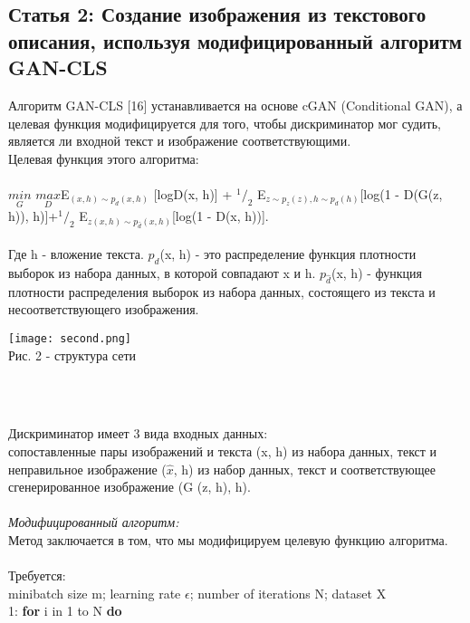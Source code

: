 \documentclass{article}
\begin{document}
    \newpage
    \begin{center} 
    \section{Статья 2: Создание изображения из текстового описания, используя модифицированный алгоритм GAN-CLS}
    \end{center} 
    \large
    Алгоритм GAN-CLS [16] устанавливается на основе cGAN (Conditional GAN), а целевая функция модифицируется для того, чтобы дискриминатор мог судить, является ли входной текст и изображение соответствующими.\\
    Целевая функция этого алгоритма:\\ \\
    $\underset{G}{min}$ $\underset{D}{max}$E$_{(x,h) \sim p_{d}(x,h)}$ [logD(x, h)] + $^1/_2$ E$_{z \sim p_{z}(z),h \sim p_{d}(h)}$[log(1 - D(G(z, h)), h)]+$^1/_2$ E$_{z(x,h) \sim p_{\hat{d}}(x,h)}$[log(1 - D(x, h))].
    \\ \\
    Где h - вложение текста. $p_{d}$(x, h) - это распределение функция плотности выборок из набора данных, в которой совпадают x и h. $p_{\hat{d}}$(x, h) - функция плотности распределения выборок из набора данных, состоящего из текста и несоответствующего изображения.
    \\
    \begin{center} 
    \texttt{[image: second.png]}
    \\
    \caption{Рис. 2 - структура сети}
    \\ \\
    \end{center} 
    Дискриминатор имеет 3 вида входных данных:\\
    сопоставленные пары изображений и текста (x, h) из набора данных, текст и неправильное изображение ($\hat{x}$, h) из набор данных, текст и соответствующее сгенерированное изображение (G (z, h), h).
    \\ \\
    \textit{Модифицированный алгоритм:}\\
    Метод заключается в том, что мы модифицируем целевую функцию алгоритма.
    \\
    \\
    Требуется: \\
    minibatch size m; learning rate $\epsilon$; number of iterations N; dataset X \\
    1: \textbf {for} i in 1 to N \textbf {do}\\
\end{document}
